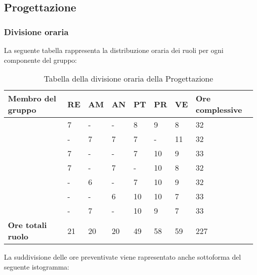 \subsection{Progettazione}

\subsubsection{Divisione oraria}
La seguente tabella rappresenta la distribuzione oraria dei ruoli per ogni componente del gruppo:
\renewcommand{\arraystretch}{2}
\begin{longtable}[h!] { C{4cm} C{1cm} C{1cm} C{1cm} C{1cm} C{1cm} C{1cm} C{3cm}}
\caption{Tabella della divisione oraria della Progettazione}\\
\rowcolor{\primaryColor}

\textcolor{\secondaryColor}{\textbf{Membro del gruppo}} & 
\textcolor{\secondaryColor}{\textbf{RE}} & 
\textcolor{\secondaryColor}{\textbf{AM}} & 
\textcolor{\secondaryColor}{\textbf{AN}} & 
\textcolor{\secondaryColor}{\textbf{PT}} & 
\textcolor{\secondaryColor}{\textbf{PR}} & 
\textcolor{\secondaryColor}{\textbf{VE}} & 
\textcolor{\secondaryColor}{\textbf{Ore complessive}}\\	
\endhead
        
\AW{}                     & 7  & - & - & 8 & 9 & 8 & 32 \\
\AT{}                     & -  & 7 & 7 & 7 & - & 11 & 32 \\
\AD{}                     & 7  & - & - & 7 & 10 & 9 & 33 \\
\EC{}                     & 7  & - & 7 & - & 10 & 8 & 32 \\
\EM{}                     & -  & 6 & - & 7 & 10 & 9 & 32 \\
\FP{}                     & -  & - & 6 & 10 & 10 & 7 & 33 \\
\GG{}                     & -  & 7 & - & 10 & 9 & 7 & 33 \\
\textbf{Ore totali ruolo} & 21 & 20 & 20 & 49 & 58 & 59 & 227 \\

		
\end{longtable}
La suddivisione delle ore preventivate viene rapresentato anche sottoforma del seguente istogramma:
